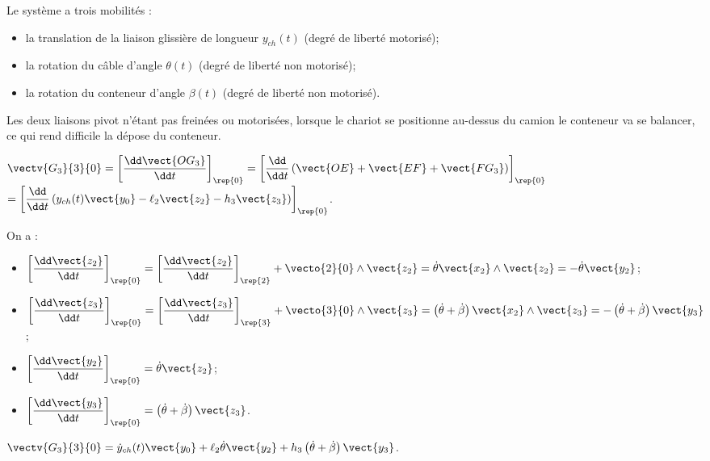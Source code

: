 \begin{multicols}{2}
\begin{corrige}
Le système a trois mobilités : 
\begin{itemize}
\item la translation de la liaison glissière de longueur $y_{ch}(t)$ (degré de liberté motorisé);
\item la rotation du câble d'angle $\theta(t)$ (degré de liberté non motorisé);
\item la rotation du conteneur d'angle $\beta(t)$ (degré de liberté non motorisé). 
\end{itemize}

Les deux liaisons pivot n'étant pas freinées ou motorisées, lorsque le chariot se positionne au-dessus du camion le conteneur va se balancer, ce qui rend difficile la dépose du conteneur. 

\end{corrige}
\else
\fi

\ifprof
\begin{corrige}
$\vectv{G_3}{3}{0}=   \left[\dfrac{\dd \vect{OG_3}}{\dd t}\right]_{\rep{0}}=   \left[\dfrac{\dd }{\dd t}\left(
\vect{OE}+\vect{EF}+\vect{FG_3} \right)\right]_{\rep{0}}$ 
$=   \left[\dfrac{\dd }{\dd t}\left(
y_{ch}(t) \vect{y_0}-\ell_2\vect{z_2}-h_3\vect{z_3} \right)\right]_{\rep{0}}$. 

On a : 
\begin{itemize}
\item $ \left[\dfrac{\dd \vect{z_2}}{\dd t}\right]_{\rep{0}}=\left[\dfrac{\dd \vect{z_2}}{\dd t}\right]_{\rep{2}}+\vecto{2}{0} \wedge \vect{z_2}=\dot{\theta} \vect{x_2}\wedge \vect{z_2}=-\dot{\theta} \vect{y_2}$;
\item $ \left[\dfrac{\dd \vect{z_3}}{\dd t}\right]_{\rep{0}}=\left[\dfrac{\dd \vect{z_3}}{\dd t}\right]_{\rep{3}}+\vecto{3}{0} \wedge \vect{z_3}=\left(\dot{\theta}+\dot{\beta}\right) \vect{x_2}\wedge \vect{z_3}=-\left(\dot{\theta}+\dot{\beta}\right) \vect{y_3}$;
\item $ \left[\dfrac{\dd \vect{y_2}}{\dd t}\right]_{\rep{0}}=\dot{\theta} \vect{z_2}$;
\item $ \left[\dfrac{\dd \vect{y_3}}{\dd t}\right]_{\rep{0}}=\left(\dot{\theta}+\dot{\beta}\right) \vect{z_3}$.
\end{itemize}

$\vectv{G_3}{3}{0}=   
\dot{y}_{ch}(t) \vect{y_0}+\ell_2\dot{\theta} \vect{y_2}+h_3\left(\dot{\theta}+\dot{\beta}\right) \vect{y_3}$.


\end{corrige}
\end{multicols}
